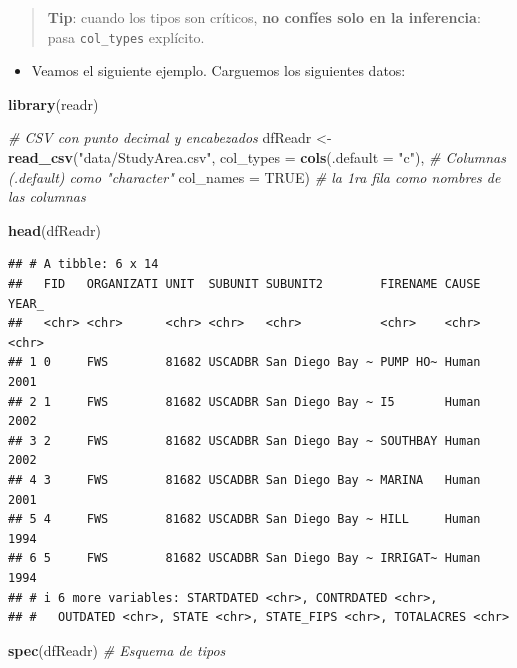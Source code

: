 \documentclass[
]{book}
\newenvironment{Shaded}{\begin{snugshade}}{\end{snugshade}}
\newcommand{\AttributeTok}[1]{\textcolor[rgb]{0.13,0.29,0.53}{#1}}
\newcommand{\CommentTok}[1]{\textcolor[rgb]{0.56,0.35,0.01}{\textit{#1}}}
\newcommand{\ConstantTok}[1]{\textcolor[rgb]{0.56,0.35,0.01}{#1}}
\newcommand{\FunctionTok}[1]{\textcolor[rgb]{0.13,0.29,0.53}{\textbf{#1}}}
\newcommand{\NormalTok}[1]{#1}
\newcommand{\OtherTok}[1]{\textcolor[rgb]{0.56,0.35,0.01}{#1}}
\newcommand{\StringTok}[1]{\textcolor[rgb]{0.31,0.60,0.02}{#1}}
\providecommand{\tightlist}{%
  \setlength{\itemsep}{0pt}\setlength{\parskip}{0pt}}
\begin{document}
\begin{quote}
\textbf{Tip}: cuando los tipos son críticos, \textbf{no confíes solo en la inferencia}: pasa \texttt{col\_types} explícito.
\end{quote}

\begin{itemize}
\tightlist
\item
  Veamos el siguiente ejemplo. Carguemos los siguientes datos:
\end{itemize}

\begin{Shaded}
\begin{Highlighting}[]
\FunctionTok{library}\NormalTok{(readr)}

\CommentTok{\# CSV con punto decimal y encabezados}
\NormalTok{dfReadr }\OtherTok{\textless{}{-}} \FunctionTok{read\_csv}\NormalTok{(}\StringTok{"data/StudyArea.csv"}\NormalTok{,           }
  \AttributeTok{col\_types =} \FunctionTok{cols}\NormalTok{(}\AttributeTok{.default =} \StringTok{"c"}\NormalTok{),  }\CommentTok{\# Columnas (.default) como "character"}
  \AttributeTok{col\_names =} \ConstantTok{TRUE}\NormalTok{)                  }\CommentTok{\# la 1ra fila como nombres de las columnas}

\FunctionTok{head}\NormalTok{(dfReadr)}
\end{Highlighting}
\end{Shaded}

\begin{verbatim}
## # A tibble: 6 x 14
##   FID   ORGANIZATI UNIT  SUBUNIT SUBUNIT2        FIRENAME CAUSE YEAR_
##   <chr> <chr>      <chr> <chr>   <chr>           <chr>    <chr> <chr>
## 1 0     FWS        81682 USCADBR San Diego Bay ~ PUMP HO~ Human 2001 
## 2 1     FWS        81682 USCADBR San Diego Bay ~ I5       Human 2002 
## 3 2     FWS        81682 USCADBR San Diego Bay ~ SOUTHBAY Human 2002 
## 4 3     FWS        81682 USCADBR San Diego Bay ~ MARINA   Human 2001 
## 5 4     FWS        81682 USCADBR San Diego Bay ~ HILL     Human 1994 
## 6 5     FWS        81682 USCADBR San Diego Bay ~ IRRIGAT~ Human 1994 
## # i 6 more variables: STARTDATED <chr>, CONTRDATED <chr>,
## #   OUTDATED <chr>, STATE <chr>, STATE_FIPS <chr>, TOTALACRES <chr>
\end{verbatim}

\begin{Shaded}
\begin{Highlighting}[]
\FunctionTok{spec}\NormalTok{(dfReadr)         }\CommentTok{\# Esquema de tipos}
\end{Highlighting}
\end{Shaded}
\end{document}
